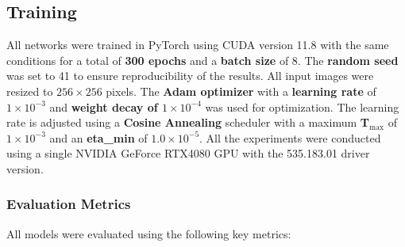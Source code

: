 \documentclass[lettersize,journal]{IEEEtran}
\begin{document}
\subsection{Training}
All networks were trained in PyTorch using CUDA version 11.8 with the same conditions for a total of \textbf{300 epochs} and a \textbf{batch size} of 8. The \textbf{random seed} was set to 41 to ensure reproducibility of the results. All input images were resized to $256 \times 256$ pixels. The \textbf{Adam optimizer} with a \textbf{learning rate} of $1\times 10^{-3}$ and \textbf{weight decay of $1 \times 10^{-4}$} was used for optimization. The learning rate is adjusted using a \textbf{Cosine Annealing} scheduler with a maximum \textbf{T$_{\text{max}}$} of $1\times 10^{-3}$ and an \textbf{eta\_min} of $1.0 \times 10^{-5}$. All the experiments were conducted using a single NVIDIA GeForce RTX4080 GPU with the 535.183.01 driver version.


\subsubsection{Evaluation Metrics}
All models were evaluated using the following key metrics:
\end{document}
